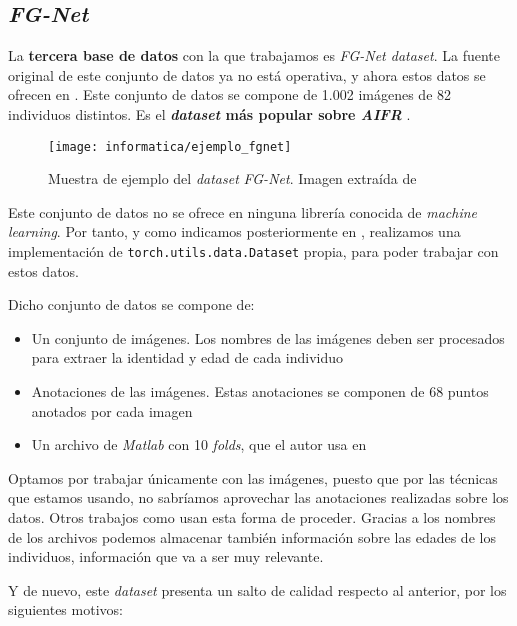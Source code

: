 \subsection{\textit{FG-Net}} \label{isec:fgnet}

La \textbf{tercera base de datos} con la que trabajamos es \textit{FG-Net dataset}. La fuente original de este conjunto de datos ya no está operativa, y ahora estos datos se ofrecen en \cite{informatica:fgnet_dataset}. Este conjunto de datos se compone de 1.002 imágenes de 82 individuos distintos. Es el \textbf{\textit{dataset} más popular sobre \textit{AIFR}} \cite{informatica:best_fgnet_model}.

\begin{figure}[H]
    \centering
    \texttt{[image: informatica/ejemplo\_fgnet]}
    \caption{Muestra de ejemplo del \textit{dataset} \textit{FG-Net}. Imagen extraída de \cite{informatica:fg_net_papers_with_code}}
\end{figure}

Este conjunto de datos no se ofrece en ninguna librería conocida de \textit{machine learning}. Por tanto, y como indicamos posteriormente en , realizamos una implementación de \lstinline{torch.utils.data.Dataset} propia, para poder trabajar con estos datos.

Dicho conjunto de datos se compone de:

\begin{itemize}
    \item Un conjunto de imágenes. Los nombres de las imágenes deben ser procesados para extraer la identidad y edad de cada individuo
    \item Anotaciones de las imágenes. Estas anotaciones se componen de 68 puntos anotados por cada imagen
    \item Un archivo de \textit{Matlab} con 10 \textit{folds}, que el autor usa en \cite{informatica:yanweifu_work}
\end{itemize}

Optamos por trabajar únicamente con las imágenes, puesto que por las técnicas que estamos usando, no sabríamos aprovechar las anotaciones realizadas sobre los datos. Otros trabajos como \cite{informatica:facenet} usan esta forma de proceder. Gracias a los nombres de los archivos podemos almacenar también información sobre las edades de los individuos, información que va a ser muy relevante.

Y de nuevo, este \textit{dataset} presenta un salto de calidad respecto al anterior, por los siguientes motivos:

